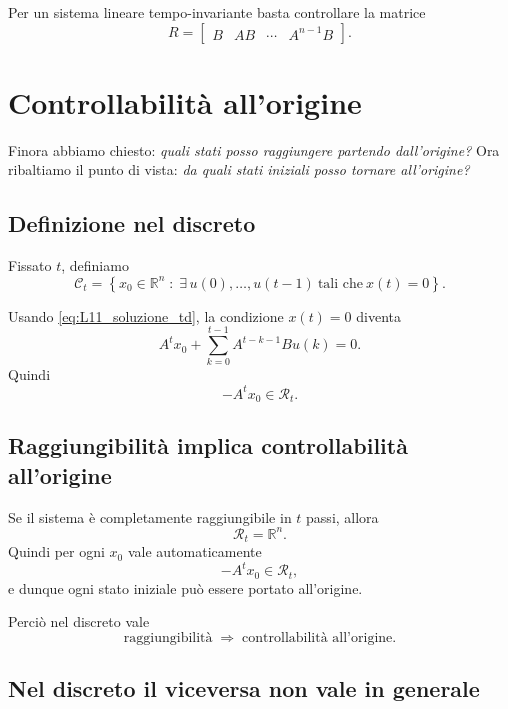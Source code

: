 Per un sistema lineare tempo-invariante basta controllare la matrice
\[
R=
\begin{bmatrix}
B & AB & \cdots & A^{n-1}B
\end{bmatrix}.
\]

\section{Controllabilità all'origine}

Finora abbiamo chiesto: \emph{quali stati posso raggiungere partendo dall’origine?}  
Ora ribaltiamo il punto di vista: \emph{da quali stati iniziali posso tornare all’origine?}

\subsection{Definizione nel discreto}

Fissato \(t\), definiamo
\begin{equation}
\mathcal{C}_t=
\left\{
x_0\in\mathbb{R}^n \;:\;
\exists\,u(0),\dots,u(t-1)\ \text{tali che}\ x(t)=0
\right\}.
\label{eq:L11_Ct}
\end{equation}

Usando \eqref{eq:L11_soluzione_td}, la condizione \(x(t)=0\) diventa
\[
A^t x_0+\sum_{k=0}^{t-1}A^{t-k-1}Bu(k)=0.
\]
Quindi
\begin{equation}
-A^t x_0\in \mathcal{R}_t.
\label{eq:L11_zero_condition}
\end{equation}

\subsection{Raggiungibilità implica controllabilità all'origine}

Se il sistema è completamente raggiungibile in \(t\) passi, allora
\[
\mathcal{R}_t=\mathbb{R}^n.
\]
Quindi per ogni \(x_0\) vale automaticamente
\[
-A^t x_0\in\mathcal{R}_t,
\]
e dunque ogni stato iniziale può essere portato all’origine.

Perciò nel discreto vale
\begin{equation}
\text{raggiungibilità} \;\Longrightarrow\; \text{controllabilità all'origine}.
\label{eq:L11_ragg_impl_ctrl0_td}
\end{equation}

\subsection{Nel discreto il viceversa non vale in generale}


